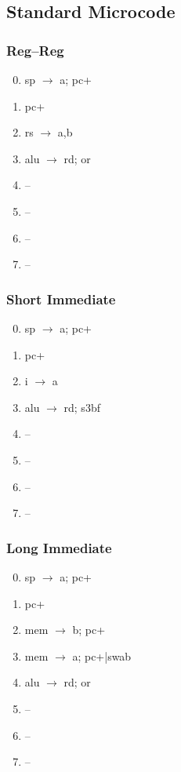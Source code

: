 \documentclass[11pt]{book}
\begin{document}
\subsection*{Standard Microcode}
\begin{multicols}{3}\ttfamily\selectfont\small
  \subsubsection*{Reg--Reg}
  \begin{enumerate}\setcounter{enumi}{-1}
  \item sp \(\rightarrow\) a; pc+
  \item pc+
  \item rs \(\rightarrow\) a,b
  \item alu \(\rightarrow\) rd; or
  \item --
  \item --
  \item --
  \item --
  \end{enumerate}
  \columnbreak
  \subsubsection*{Short Immediate}
  \begin{enumerate}\setcounter{enumi}{-1}
  \item sp \(\rightarrow\) a; pc+
  \item pc+
  \item i \(\rightarrow\) a
  \item alu \(\rightarrow\) rd; s3bf
  \item --
  \item --
  \item --
  \item --
  \end{enumerate}
  \columnbreak
  \subsubsection*{Long Immediate}
  \begin{enumerate}\setcounter{enumi}{-1}
  \item sp \(\rightarrow\) a; pc+
  \item pc+
  \item mem \(\rightarrow\) b; pc+
  \item mem \(\rightarrow\) a; pc+|swab
  \item alu \(\rightarrow\) rd; or
  \item --
  \item --
  \item --
  \end{enumerate}
\end{multicols}
\end{document}
